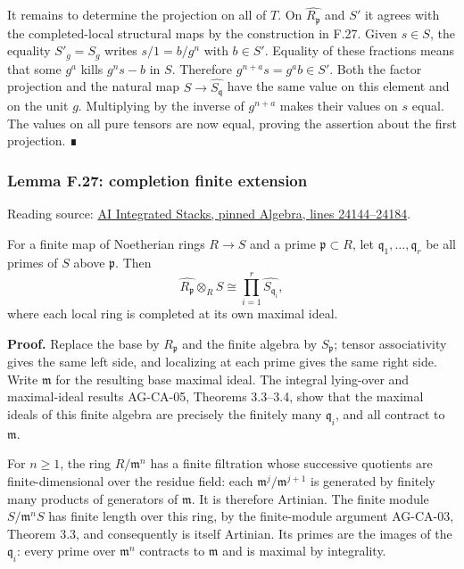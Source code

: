 \documentclass[11pt,a4paper,openany]{report}
\begin{document}
It remains to determine the projection on all of \(T\). On \(\widehat{R_{\mathfrak p}}\) and \(S'\) it agrees with the completed-local structural maps by the construction in F.27. Given \(s\in S\), the equality \(S'_g=S_g\) writes \(s/1=b/g^n\) with \(b\in S'\). Equality of these fractions means that some \(g^a\) kills \(g^ns-b\) in \(S\). Therefore \(g^{n+a}s=g^ab\in S'\). Both the factor projection and the natural map \(S\to\widehat{S_{\mathfrak q}}\) have the same value on this element and on the unit \(g\). Multiplying by the inverse of \(g^{n+a}\) makes their values on \(s\) equal. The values on all pure tensors are now equal, proving the assertion about the first projection. ∎

\label{AG-RG-S05-algebra-lemma-completion-finite-extension}

\subsubsection{Lemma F.27: completion finite extension}\label{AG-RG-S05-lemma-f.27-completion-finite-extension}

Reading source: \href{https://github.com/KokunoYumeto/unofficial-stacks-project-ai-drafts/blob/565b10e987aba5969b21145a0833f42d69f96790/algebra.tex\#L24144-L24184}{AI Integrated Stacks, pinned Algebra, lines 24144--24184}.

For a finite map of Noetherian rings \(R\to S\) and a prime \(\mathfrak p\subset R\), let \(\mathfrak q_1,\ldots,\mathfrak q_r\) be all primes of \(S\) above \(\mathfrak p\). Then \[\widehat{R_{\mathfrak p}}\otimes_RS
\cong\prod_{i=1}^r\widehat{S_{\mathfrak q_i}},\] where each local ring is completed at its own maximal ideal.

\textbf{Proof.} Replace the base by \(R_{\mathfrak p}\) and the finite algebra by \(S_{\mathfrak p}\); tensor associativity gives the same left side, and localizing at each prime gives the same right side. Write \(\mathfrak m\) for the resulting base maximal ideal. The integral lying-over and maximal-ideal results AG-CA-05, Theorems 3.3--3.4, show that the maximal ideals of this finite algebra are precisely the finitely many \(\mathfrak q_i\), and all contract to \(\mathfrak m\).

For \(n\geq1\), the ring \(R/\mathfrak m^n\) has a finite filtration whose successive quotients are finite-dimensional over the residue field: each \(\mathfrak m^j/\mathfrak m^{j+1}\) is generated by finitely many products of generators of \(\mathfrak m\). It is therefore Artinian. The finite module \(S/\mathfrak m^nS\) has finite length over this ring, by the finite-module argument AG-CA-03, Theorem 3.3, and consequently is itself Artinian. Its primes are the images of the \(\mathfrak q_i\): every prime over \(\mathfrak m^n\) contracts to \(\mathfrak m\) and is maximal by integrality.
\end{document}
